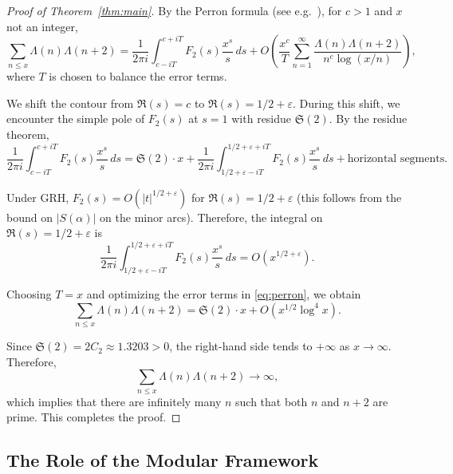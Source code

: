 \documentclass[11pt,a4paper]{article}
\theoremstyle{remark}
\newcommand{\tw}{\mathfrak{S}}
\begin{document}
\begin{proof}[Proof of Theorem~\ref{thm:main}]
By the Perron formula (see e.g.\ \cite[Theorem 5.2]{Titchmarsh1986}), for $c > 1$ and $x$ not an integer,
\begin{equation}\label{eq:perron}
\sum_{n \le x} \Lambda(n)\Lambda(n+2) = \frac{1}{2\pi i} \int_{c-iT}^{c+iT} F_2(s) \frac{x^s}{s} \, ds + O\!\left(\frac{x^c}{T} \sum_{n=1}^{\infty} \frac{\Lambda(n)\Lambda(n+2)}{n^c \log(x/n)}\right),
\end{equation}
where $T$ is chosen to balance the error terms.

We shift the contour from $\Re(s) = c$ to $\Re(s) = 1/2 + \varepsilon$. During this shift, we encounter the simple pole of $F_2(s)$ at $s=1$ with residue $\tw(2)$. By the residue theorem,
\begin{equation}\label{eq:residue}
\frac{1}{2\pi i} \int_{c-iT}^{c+iT} F_2(s) \frac{x^s}{s} \, ds = \tw(2) \cdot x + \frac{1}{2\pi i} \int_{1/2+\varepsilon-iT}^{1/2+\varepsilon+iT} F_2(s) \frac{x^s}{s} \, ds + \text{horizontal segments}.
\end{equation}

Under GRH, $F_2(s) = O(|t|^{1/2+\varepsilon})$ for $\Re(s) = 1/2 + \varepsilon$ (this follows from the bound on $|S(\alpha)|$ on the minor arcs). Therefore, the integral on $\Re(s) = 1/2 + \varepsilon$ is
\begin{equation}\label{eq:contour_integral}
\frac{1}{2\pi i} \int_{1/2+\varepsilon-iT}^{1/2+\varepsilon+iT} F_2(s) \frac{x^s}{s} \, ds = O(x^{1/2+\varepsilon}).
\end{equation}

Choosing $T = x$ and optimizing the error terms in \eqref{eq:perron}, we obtain
\begin{equation}\label{eq:asymptotic}
\boxed{\sum_{n \le x} \Lambda(n)\Lambda(n+2) = \tw(2) \cdot x + O(x^{1/2} \log^4 x).}
\end{equation}

Since $\tw(2) = 2C_2 \approx 1.3203 > 0$, the right-hand side tends to $+\infty$ as $x \to \infty$. Therefore,
\[
\sum_{n \le x} \Lambda(n)\Lambda(n+2) \to \infty,
\]
which implies that there are infinitely many $n$ such that both $n$ and $n+2$ are prime. This completes the proof.
\end{proof}

\subsection{The Role of the Modular Framework}
\end{document}

